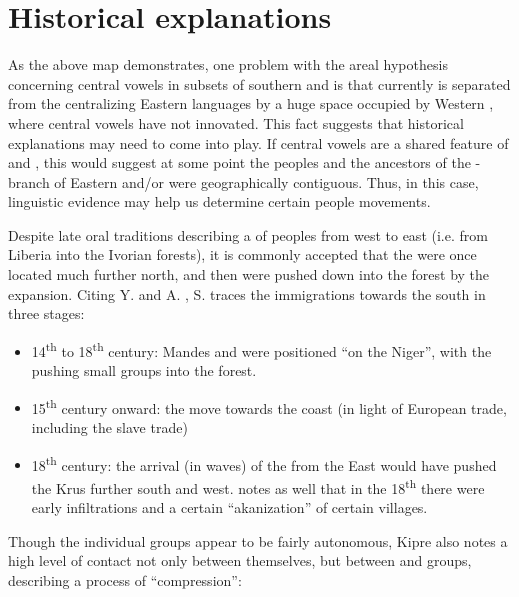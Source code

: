 \documentclass[output=paper
,newtxmath
,modfonts
,nonflat]{langsci/langscibook}
\begin{document}
\section{Historical explanations}\label{sec:zogbo:6} 

As the above map demonstrates, one problem with the areal hypothesis concerning central vowels in subsets of southern  and  is that currently  is separated from the centralizing Eastern languages by a huge space occupied by Western , where central vowels have not innovated. This fact suggests that historical explanations may need to come into play. If central vowels are a shared feature of  and , this would suggest at some point the  peoples and the ancestors of the - branch of Eastern  and/or  were geographically contiguous. Thus, in this case, linguistic evidence may help us determine certain people movements.   

Despite late oral traditions describing a  of  peoples from west to east (i.e. from Liberia into the Ivorian forests), it is commonly accepted that the  were once located much further north, and then were pushed down into the forest by the  expansion. Citing Y. \citet{Person1964} and A. \citet{Schwartz1970}, S. \citet{Lafage1983} traces the  immigrations towards the south in three stages:

\begin{itemize}
\item 14\textsuperscript{th} to 18\textsuperscript{th} century: Mandes and  were positioned “on the Niger”, with the  pushing small  groups into the forest.\\[-0.75cm] 
\item 15\textsuperscript{th} century onward: the  move towards the coast (in light of European trade, including the slave trade) \\[-0.75cm]
\item 18\textsuperscript{th} century: the arrival (in waves) of the  from the East would have pushed the Krus further south and west. \citet[68]{kipre2005} notes as well that in the 18\textsuperscript{th} there were early  infiltrations and a certain “akanization” of certain  villages.
\end{itemize}

Though the individual  groups appear to be fairly autonomous, Kipre also notes a high level of contact not only between  themselves, but between  and  groups, describing a process of “compression”: 
\end{document}
